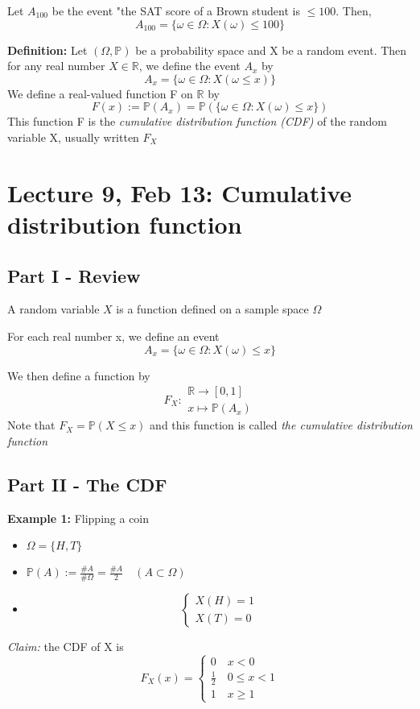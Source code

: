 \documentclass[12pt]{article}
\renewcommand{\P}{\mathbb{P}}
\begin{document}
Let $A_{100}$ be the event "the SAT score of a Brown student is $\leq 100$. Then, 
\[A_{100} = \{\omega \in \Omega : X(\omega) \leq 100\}\]

\textbf{Definition:} Let $(\Omega, \P)$ be a probability space and X be a random event. Then for any real number $X \in \mathbb{R}$, we define the event $A_x$ by 
\[A_x = \{\omega \in \Omega : X(\omega \leq x)\}\]
We define a real-valued function F on $\mathbb{R}$ by 
\[F(x) := \P(A_x) = \P(\{\omega \in \Omega : X(\omega) \leq x\})\]
This function F is the \emph{cumulative distribution function (CDF)} of the random variable X, usually written $F_X$

\section{Lecture 9, Feb 13: Cumulative distribution function}
\subsection*{Part I  - Review}
A random variable $X$ is a function defined on a sample space $\Omega$

For each real number x, we define an event 
\[A_x = \{\omega \in \Omega : X(\omega) \leq x\}\]

We then define a function by 
\[F_X : \begin{array}{c}
    \mathbb{R} \to [0, 1]\\
    x \mapsto \P(A_x)
\end{array}\]
Note that $F_X = \P(X \leq x)$ and this function is called \emph{the cumulative distribution function}

\subsection*{Part II - The CDF}
\textbf{Example 1:} Flipping a coin 
\begin{itemize}
    \item $\Omega = \{H, T\}$
    \item $\P(A) := \frac{\#A}{\#\Omega} = \frac{\#A}{2} \quad (A \subset \Omega)$
    \item \[\begin{cases}
        X(H) = 1\\
        X(T) = 0
    \end{cases}\] 
\end{itemize}

\emph{Claim:} the CDF of X is 
\[F_X(x) = \begin{cases*}
    0 \quad x < 0\\
    \frac{1}{2} \quad 0 \leq x < 1\\
    1 \quad x \geq 1
\end{cases*}\]
\end{document}
